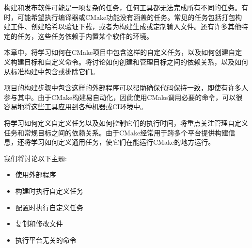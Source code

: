 构建和发布软件可能是一项复杂的任务，任何工具都无法完成所有不同的任务。有时，可能希望执行编译器或CMake功能没有涵盖的任务。常见的任务包括打包构建工件、创建哈希以验证下载，或者为构建生成或定制输入文件。还有许多其他特定的任务，这些任务依赖于内置某个软件的环境。

本章中，将学习如何在CMake项目中包含这样的自定义任务，以及如何创建自定义构建目标和自定义命令。将讨论如何创建和管理目标之间的依赖关系，以及如何从标准构建中包含或排除它们。

项目的构建步骤中包含这样的外部程序可以帮助确保代码保持一致，即使有许多人参与其中。由于CMake构建易自动化，因此使用CMake调用必要的命令，可以很容易地将这些工具应用到各种机器或CI环境中。

将学习如何定义自定义任务以及如何控制它们的执行时间，将重点关注管理自定义任务和常规目标之间的依赖关系。由于CMake经常用于跨多个平台提供构建信息，还将学习如何定义通用任务，使它们在能运行CMake的地方运行。

我们将讨论以下主题:

\begin{itemize}
\item 
使用外部程序

\item 
构建时执行自定义任务

\item 
配置时执行自定义任务

\item 
复制和修改文件

\item 
执行平台无关的命令
\end{itemize}





